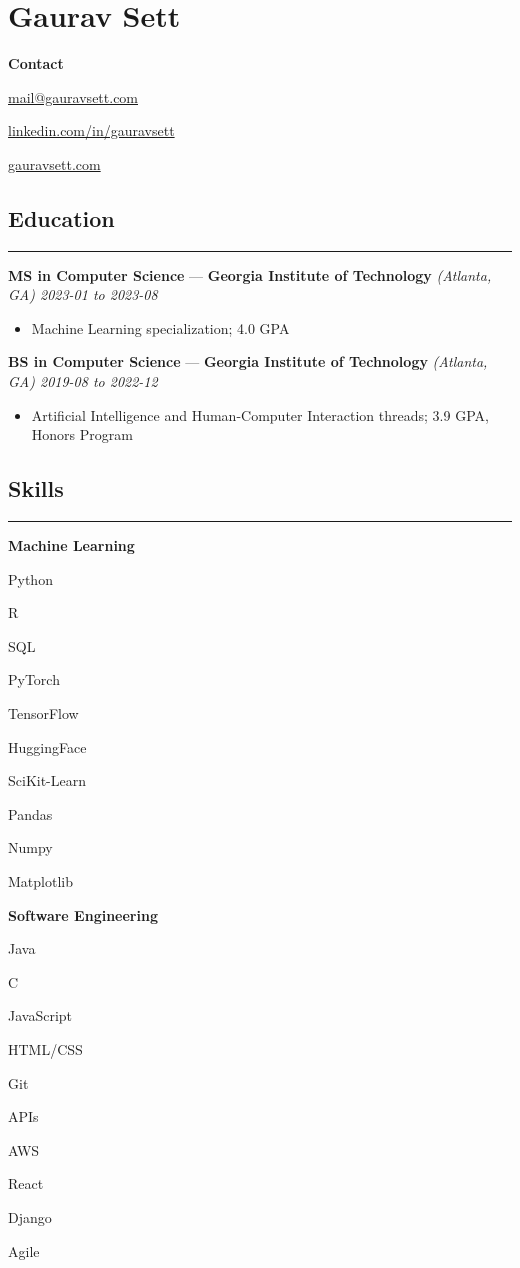 \documentclass[10pt]{article}
\newcommand{\resumeHeading}[1]{
    \subsection*{#1}
    \hrule
    \vspace*{5pt}
}
\newcommand{\resumeSubHeading}[5]{
    \vspace*{5pt}
    \textbf{#1} — \textbf{#2} \textsl{(#3) \hfill #4 to #5}
}
\newcommand{\resumeListHeading}[1]{\vspace*{5pt}\textbf{#1}}
\begin{document}
\section*{Gaurav Sett}

\textbf{Contact}
\begin{itemize*}[label=$|$]
    \item \href{mailto:mail@gauravsett.com}{mail@gauravsett.com}
    \item \href{https://linkedin.com/in/gauravsett}{linkedin.com/in/gauravsett}
    \item \href{https://gauravsett.com}{gauravsett.com}
\end{itemize*}



\resumeHeading{Education}

\resumeSubHeading
    {MS in Computer Science}
    {Georgia Institute of Technology}
    {Atlanta, GA}
    {2023-01}
    {2023-08}
\begin{itemize}
    \item Machine Learning specialization; 4.0 GPA
\end{itemize}

\resumeSubHeading
    {BS in Computer Science}
    {Georgia Institute of Technology}
    {Atlanta, GA}
    {2019-08}
    {2022-12}
\begin{itemize}
    \item Artificial Intelligence and Human-Computer Interaction threads; 3.9 GPA, Honors Program
\end{itemize}



\resumeHeading{Skills}

\resumeListHeading{Machine Learning}
\begin{itemize*}[label=$|$]
    \item Python
    \item R
    \item SQL
    \item PyTorch
    \item TensorFlow
    \item HuggingFace
    \item SciKit-Learn
    \item Pandas
    \item Numpy
    \item Matplotlib
\end{itemize*}

\resumeListHeading{Software Engineering}
\begin{itemize*}[label=$|$]
    \item Java
    \item C
    \item JavaScript 
    \item HTML/CSS 
    \item Git
    \item APIs
    \item AWS
    \item React
    \item Django
    \item Agile
\end{itemize*}
\end{document}
